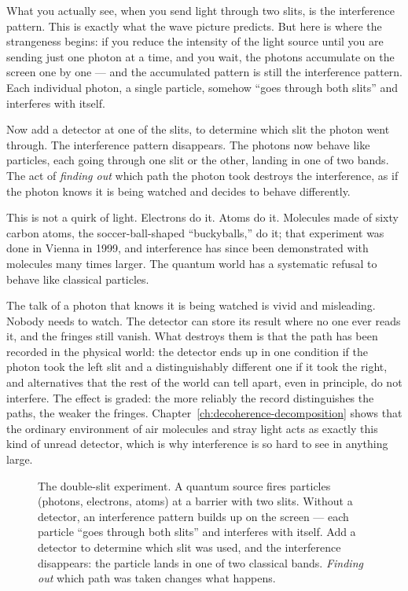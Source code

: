 What you actually see, when you send light through two slits, is the interference pattern. This is exactly what the wave picture predicts. But here is where the strangeness begins: if you reduce the intensity of the light source until you are sending just one photon at a time, and you wait, the photons accumulate on the screen one by one --- and the accumulated pattern is still the interference pattern. Each individual photon, a single particle, somehow ``goes through both slits'' and interferes with itself.

Now add a detector at one of the slits, to determine which slit the photon went through. The interference pattern disappears. The photons now behave like particles, each going through one slit or the other, landing in one of two bands. The act of \emph{finding out} which path the photon took destroys the interference, as if the photon knows it is being watched and decides to behave differently.

This is not a quirk of light. Electrons do it. Atoms do it. Molecules made of sixty carbon atoms, the soccer-ball-shaped ``buckyballs,'' do it; that experiment was done in Vienna in 1999, and interference has since been demonstrated with molecules many times larger. The quantum world has a systematic refusal to behave like classical particles.

The talk of a photon that knows it is being watched is vivid and misleading. Nobody needs to watch. The detector can store its result where no one ever reads it, and the fringes still vanish. What destroys them is that the path has been recorded in the physical world: the detector ends up in one condition if the photon took the left slit and a distinguishably different one if it took the right, and alternatives that the rest of the world can tell apart, even in principle, do not interfere. The effect is graded: the more reliably the record distinguishes the paths, the weaker the fringes. Chapter~\ref{ch:decoherence-decomposition} shows that the ordinary environment of air molecules and stray light acts as exactly this kind of unread detector, which is why interference is so hard to see in anything large.

\begin{figure}[htbp]
  \centering
  \resizebox{\linewidth}{!}{}
  \caption[The double-slit experiment]{The double-slit experiment. A quantum source fires particles (photons, electrons, atoms) at a barrier with two slits. Without a detector, an interference pattern builds up on the screen --- each particle ``goes through both slits'' and interferes with itself. Add a detector to determine which slit was used, and the interference disappears: the particle lands in one of two classical bands. \emph{Finding out} which path was taken changes what happens.}
  \label{fig:double-slit}
\end{figure}

